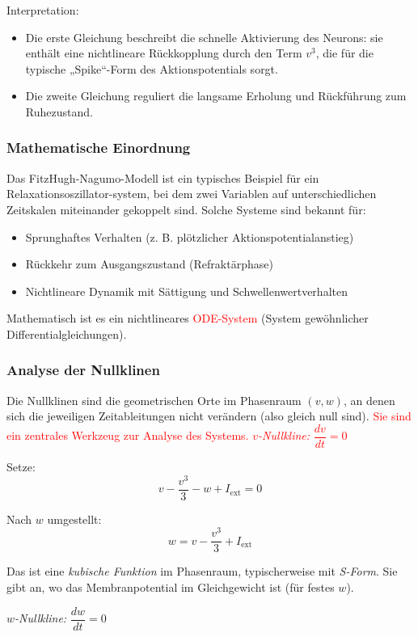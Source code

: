\begin{refsection}
Interpretation:
\begin{itemize}
\item Die erste Gleichung beschreibt die schnelle Aktivierung des Neurons: sie enthält eine nichtlineare Rückkopplung durch den Term $v^3$, die für die typische „Spike“-Form des Aktionspotentials sorgt.
\item Die zweite Gleichung reguliert die langsame Erholung und Rückführung zum Ruhezustand.
\end{itemize}

\subsubsection{Mathematische Einordnung}
Das FitzHugh-Nagumo-Modell ist ein typisches Beispiel für ein Relaxationsoszillator-system, bei dem zwei Variablen auf unterschiedlichen Zeitskalen miteinander gekoppelt sind. Solche Systeme sind bekannt für:
\begin{itemize}
	\item Sprunghaftes Verhalten (z. B. plötzlicher Aktionspotentialanstieg)
	\item Rückkehr zum Ausgangszustand (Refraktärphase)
	\item Nichtlineare Dynamik mit Sättigung und Schwellenwertverhalten
\end{itemize}
Mathematisch ist es ein nichtlineares \textcolor{red}{ODE-System} (System gewöhnlicher Differentialgleichungen).

\subsubsection{Analyse der Nullklinen}
Die Nullklinen sind die geometrischen Orte im Phasenraum $(v,w)$, an denen sich die jeweiligen Zeitableitungen nicht verändern (also gleich null sind). \textcolor{red}{Sie sind ein zentrales Werkzeug zur Analyse des Systems.
\emph{$v$-Nullkline:} $\dfrac{dv}{dt} = 0$}

Setze:
\[
v - \frac{v^3}{3} - w + I_{\text{ext}} = 0
\]

\noindent
Nach $w$ umgestellt:
\[
w = v - \frac{v^3}{3} + I_{\text{ext}}
\]

Das ist eine \emph{kubische Funktion} im Phasenraum, typischerweise mit \emph{S-Form}.  
Sie gibt an, wo das Membranpotential im Gleichgewicht ist (für festes $w$).

\vspace{1em}

\emph{$w$-Nullkline:} $\dfrac{dw}{dt} = 0$


\end{refsection}
